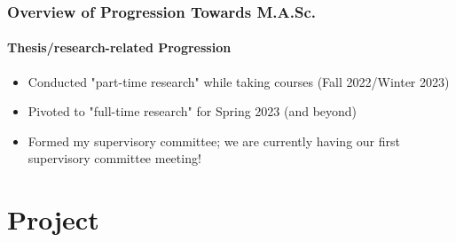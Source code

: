 \documentclass{beamer}
\begin{document}
\begin{frame}
    \frametitle{Overview of Progression Towards M.A.Sc.}
    \framesubtitle{Thesis/research-related Progression}
    \begin{itemize}
        \item<1-> Conducted "part-time research" while taking courses (Fall 2022/Winter 2023)
        \item<2-> Pivoted to "full-time research" for Spring 2023 (and beyond)
        \item<3-> Formed my supervisory committee; we are currently having our first supervisory committee meeting!
    \end{itemize}
\end{frame}


\section{Project}
\end{document}
